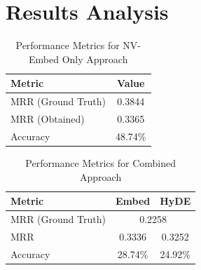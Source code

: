 \section{Results Analysis}

\begin{table}[ht]
    \centering
    \caption{Performance Metrics for NV-Embed Only Approach}
    \label{tab:nvembed_results}
    \begin{tabular}{|l|c|}
        \hline
        \textbf{Metric} & \textbf{Value} \\
        \hline
        MRR (Ground Truth) & 0.3844 \\
        \hline
        MRR (Obtained) & 0.3365 \\
        \hline
        Accuracy & 48.74\% \\
        \hline
    \end{tabular}
\end{table}

\begin{table}[ht]
    \centering
    \caption{Performance Metrics for Combined Approach}
    \label{tab:combined_results}
    \begin{tabular}{|l|c|c|}
        \hline
        \textbf{Metric} & \textbf{Embed} & \textbf{HyDE} \\
        \hline
        MRR (Ground Truth) & \multicolumn{2}{c|}{0.2258} \\
        \hline
        MRR & 0.3336 & 0.3252 \\
        \hline
        Accuracy & 28.74\% & 24.92\% \\
        \hline
    \end{tabular}
\end{table}

